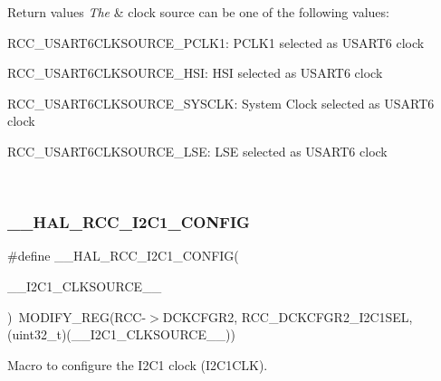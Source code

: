 \begin{DoxyRetVals}{Return values}
{\em The} & clock source can be one of the following values\+: \begin{DoxyItemize}
\item R\+C\+C\+\_\+\+U\+S\+A\+R\+T6\+C\+L\+K\+S\+O\+U\+R\+C\+E\+\_\+\+P\+C\+L\+K1\+: P\+C\+L\+K1 selected as U\+S\+A\+R\+T6 clock \item R\+C\+C\+\_\+\+U\+S\+A\+R\+T6\+C\+L\+K\+S\+O\+U\+R\+C\+E\+\_\+\+H\+SI\+: H\+SI selected as U\+S\+A\+R\+T6 clock \item R\+C\+C\+\_\+\+U\+S\+A\+R\+T6\+C\+L\+K\+S\+O\+U\+R\+C\+E\+\_\+\+S\+Y\+S\+C\+LK\+: System Clock selected as U\+S\+A\+R\+T6 clock \item R\+C\+C\+\_\+\+U\+S\+A\+R\+T6\+C\+L\+K\+S\+O\+U\+R\+C\+E\+\_\+\+L\+SE\+: L\+SE selected as U\+S\+A\+R\+T6 clock \end{DoxyItemize}
\\
\hline
\end{DoxyRetVals}
\mbox{\label{group___r_c_c_ex___exported___macros_ga90e36ab9a2478f1c6066432e230845a2}} 
\subsubsection{\texorpdfstring{\_\_HAL\_RCC\_I2C1\_CONFIG}{\_\_HAL\_RCC\_I2C1\_CONFIG}}
{\footnotesize\ttfamily \#define \+\_\+\+\_\+\+H\+A\+L\+\_\+\+R\+C\+C\+\_\+\+I2\+C1\+\_\+\+C\+O\+N\+F\+IG(\begin{DoxyParamCaption}\item[{}]{\+\_\+\+\_\+\+I2\+C1\+\_\+\+C\+L\+K\+S\+O\+U\+R\+C\+E\+\_\+\+\_\+ }\end{DoxyParamCaption})~M\+O\+D\+I\+F\+Y\+\_\+\+R\+EG(R\+CC-\/$>$D\+C\+K\+C\+F\+G\+R2, R\+C\+C\+\_\+\+D\+C\+K\+C\+F\+G\+R2\+\_\+\+I2\+C1\+S\+EL, (uint32\+\_\+t)(\+\_\+\+\_\+\+I2\+C1\+\_\+\+C\+L\+K\+S\+O\+U\+R\+C\+E\+\_\+\+\_\+))}



Macro to configure the I2\+C1 clock (I2\+C1\+C\+LK). 


